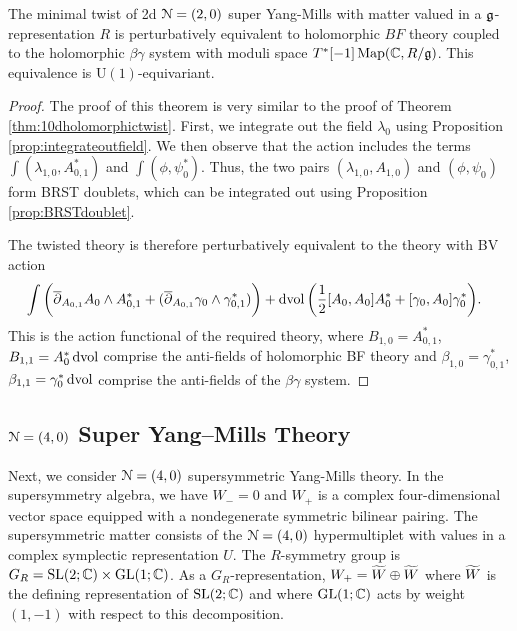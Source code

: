\documentclass[10pt, oneside]{article}
\renewcommand{\U}{\mathrm{U}}
\begin{document}
\begin{theorem} \label{thm:2d(2,0)}
The minimal twist of 2d $\cN=(2,0)$ super Yang-Mills with matter valued in a $\fg$-representation $R$ is perturbatively equivalent to holomorphic $BF$ theory coupled to the holomorphic $\beta\gamma$ system with moduli space $T^*[-1] \map(\CC , R / \fg)$.
This equivalence is $\U(1)$-equivariant.
\end{theorem}
\begin{proof}
The proof of this theorem is very similar to the proof of Theorem \ref{thm:10dholomorphictwist}.  
First, we integrate out the field $\lambda_{0}$ using Proposition \ref{prop:integrateoutfield}.  
We then observe that the action includes the terms $\int  (\lambda_{1,0} , A_{0,1}^*)$ and  $\int (\phi, \psi_0^*)$.  
Thus, the two pairs $(\lambda_{1,0}, A_{1,0})$ and $(\phi, \psi_0)$ form BRST doublets, 
which can be integrated out using Proposition \ref{prop:BRSTdoublet}.  

The twisted theory is therefore perturbatively equivalent to the theory with BV action 
\begin{align*}
& \int \bigg(\dbar_{A_{0,1}} A_{0} \wedge A_{0,1}^* + (\dbar_{A_{0,1}} \gamma_{0} \wedge \gamma_{0,1}^*) \bigg) + \dvol \bigg( \frac{1}{2}[A_0, A_0]A_0^*+  [\gamma_0, A_0] \gamma_0^*  \bigg).
\end{align*}
This is the action functional of the required theory, where $B_{1,0} = A_{0,1}^*$, $B_{1,1} = A_{0}^* \dvol$ comprise the anti-fields of holomorphic BF theory and $\beta_{1,0} = \gamma_{0,1}^*$,  $\beta_{1,1} = \gamma_0^* \dvol$ comprise the anti-fields of the $\beta\gamma$ system.
\end{proof}

\subsection{\texorpdfstring{$\cN=(4,0)$}{N=(4,0)} Super Yang--Mills Theory}

Next, we consider $\cN=(4,0)$ supersymmetric Yang-Mills theory.
In the supersymmetry algebra, we have $W_- = 0$ and $W_+$ is a complex four-dimensional vector space equipped with a nondegenerate symmetric bilinear pairing.
The supersymmetric matter consists of the $\cN = (4,0)$ hypermultiplet with values in a complex symplectic representation $U$. 
The $R$-symmetry group is $G_R = \SL(2;\CC) \times \GL(1;\CC)$.
As a $G_R$-representation, $W_+ = \Tilde{W} \oplus \Tilde{W}$ where $\Tilde{W}$ is the defining representation of $\SL(2;\CC)$ and where $\GL(1;\CC)$ acts by weight $(1,-1)$ with respect to this decomposition. 
\end{document}
